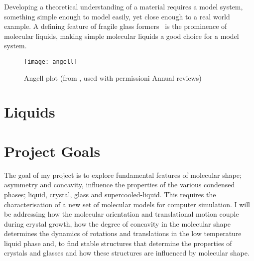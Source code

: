 Developing a theoretical understanding of a material requires a model system, something simple enough to model easily, yet close enough to a real world example. A defining feature of fragile glass formers~\tabref{} is the prominence of molecular liquids, making simple molecular liquids a good choice for a model system.


\begin{figure}
    \texttt{[image: angell]}
    \caption{Angell plot (from \textcite{lubchenko:07}, used with permissioni Annual reviews)}
    \label{fig:entropy}
\end{figure}

\section{Liquids}



\section{Project Goals}

The goal of my project is to explore fundamental features of molecular shape; asymmetry and concavity, influence the properties of the various condensed phases; liquid, crystal, glass and supercooled-liquid. This requires the characterisation of a new set of molecular models for computer simulation. I will be addressing how the molecular orientation and translational motion couple during crystal growth, how the degree of concavity in the molecular shape determines the dynamics of rotations and translations in the low temperature liquid phase and, to find stable structures that determine the properties of crystals and glasses and how these structures are influenced by molecular shape.


